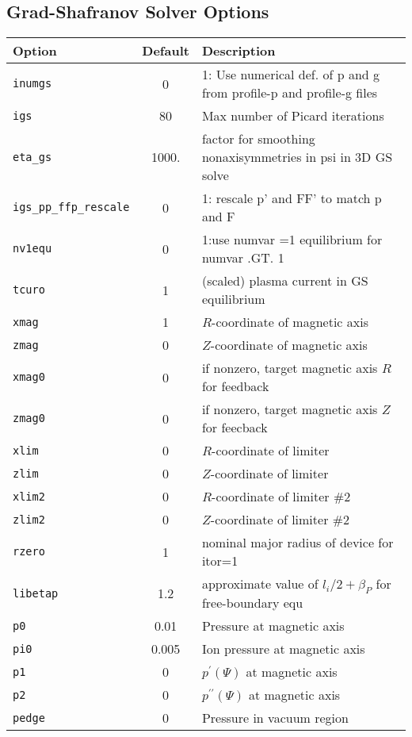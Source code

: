 \subsection{Grad-Shafranov Solver Options}
\begin{tabular}{lcp{3in}}
  \textbf{Option}&\textbf{Default}&\textbf{Description}\\
  \hline
  \texttt{inumgs}& 0      & 1: Use numerical def. of p and g from profile-p and profile-g files\\
 \texttt{igs}   & 80     & Max number of Picard iterations\\
  \texttt{eta\_gs} & 1000.& factor for smoothing nonaxisymmetries in psi in 3D GS solve \\
  \texttt{igs\_pp\_ffp\_rescale} & 0 & 1: rescale p' and FF' to match p and F \\
  \texttt{nv1equ}& 0 & 1:use numvar =1 equilibrium for numvar .GT. 1 \\
  \texttt{tcuro} & 1	  & (scaled) plasma current in GS equilibrium\\
  \texttt{xmag}  & 1      & $R$-coordinate of magnetic axis\\
  \texttt{zmag}  & 0      & $Z$-coordinate of magnetic axis\\
  \texttt{xmag0} & 0      &  if nonzero, target magnetic axis $R$ for feedback\\
  \texttt{zmag0} & 0      &  if nonzero, target magnetic axis $Z$ for feecback\\
  \texttt{xlim}  & 0      & $R$-coordinate of limiter\\
  \texttt{zlim}  & 0      & $Z$-coordinate of limiter\\
  \texttt{xlim2}  & 0      & $R$-coordinate of limiter \#2\\
  \texttt{zlim2}  & 0	   & $Z$-coordinate of limiter \#2\\
  \texttt{rzero}  & 1      & nominal major radius of device for itor=1 \\
  \texttt{libetap}& 1.2    & approximate value of $l_i/2 + \beta_P$ for free-boundary equ \\
  \texttt{p0}    & 0.01   & Pressure at magnetic axis\\
  \texttt{pi0}   & 0.005  & Ion pressure at magnetic axis\\
  \texttt{p1}    & 0     & $p^{\prime}(\Psi)$ at magnetic axis\\
  \texttt{p2}    & 0     & $p^{\prime \prime}(\Psi)$ at magnetic axis\\
  \texttt{pedge} & 0	  & Pressure in vacuum region\\

\end{tabular}
